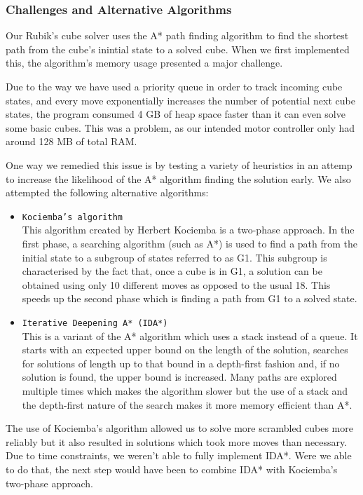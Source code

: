 \documentclass[8pt]{article}
\begin{document}
\subsubsection{Challenges and Alternative Algorithms}

Our Rubik's cube solver uses the A* path finding algorithm to find the shortest path
from the cube's inintial state to a solved cube. When we first implemented this,
the algorithm's memory usage presented a major challenge.

Due to the way we have used a priority queue in order to track incoming cube states,
and every move exponentially increases the number of potential next cube states, the
program consumed 4 GB of heap space faster than it can even solve some basic cubes.
This was a problem, as our intended motor controller only had around 128 MB of total RAM.

One way we remedied this issue is by testing a variety of heuristics in an attemp to
increase the likelihood of the A* algorithm finding the solution early. We also attempted
the following alternative algorithms:
\begin{itemize}
    \item \texttt{Kociemba's algorithm} \\ This algorithm created by Herbert Kociemba
    is a two-phase approach. In the first phase, a searching algorithm (such as A*)
    is used to find a path from the initial state to a subgroup of states referred to as G1.
    This subgroup is characterised by the fact that, once a cube is in G1, a solution can
    be obtained using only 10 different moves as opposed to the usual 18. This speeds up
    the second phase which is finding a path from G1 to a solved state.
    \item \texttt{Iterative Deepening A* (IDA*)} \\ This is a variant of the A* algorithm
    which uses a stack instead of a queue. It starts with an expected upper bound on
    the length of the solution, searches for solutions of length up to that bound in a
    depth-first fashion and, if no solution is found, the upper bound is increased.
    Many paths are explored multiple times which makes the algorithm slower but the use
    of a stack and the depth-first nature of the search makes it more memory efficient than A*.
\end{itemize}

The use of Kociemba's algorithm allowed us to solve more scrambled cubes more reliably but
it also resulted in solutions which took more moves than necessary. Due to time constraints,
we weren't able to fully implement IDA*. Were we able to do that, the next step would have been
to combine IDA* with Kociemba's two-phase approach.
\end{document}
